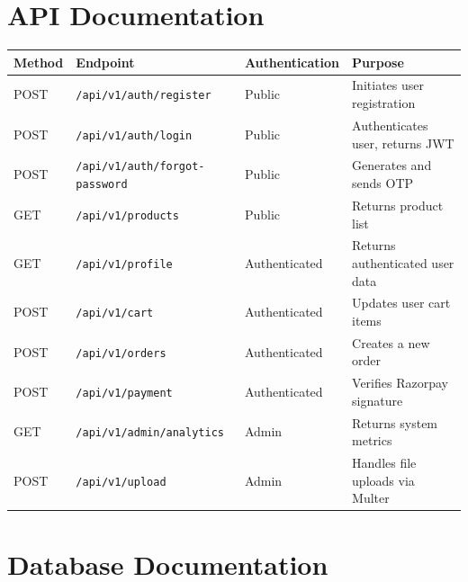 \documentclass[11pt,a4paper]{article}
\begin{document}
\section{API Documentation}
\begin{longtable}{@{}p{1.6cm}p{6.2cm}p{3cm}p{4.2cm}@{}}
    \toprule
    \textbf{Method} & \textbf{Endpoint} & \textbf{Authentication} & \textbf{Purpose} \\
    \midrule
    \endhead
    POST & \texttt{/api/v1/auth/register}        & Public        & Initiates user registration \\
    POST & \texttt{/api/v1/auth/login}           & Public        & Authenticates user, returns JWT \\
    POST & \texttt{/api/v1/auth/forgot-password} & Public        & Generates and sends OTP \\
    GET  & \texttt{/api/v1/products}             & Public        & Returns product list \\
    GET  & \texttt{/api/v1/profile}              & Authenticated & Returns authenticated user data \\
    POST & \texttt{/api/v1/cart}                 & Authenticated & Updates user cart items \\
    POST & \texttt{/api/v1/orders}               & Authenticated & Creates a new order \\
    POST & \texttt{/api/v1/payment}              & Authenticated & Verifies Razorpay signature \\
    GET  & \texttt{/api/v1/admin/analytics}      & Admin         & Returns system metrics \\
    POST & \texttt{/api/v1/upload}               & Admin         & Handles file uploads via Multer \\
    \bottomrule
\end{longtable}

\section{Database Documentation}
\end{document}
